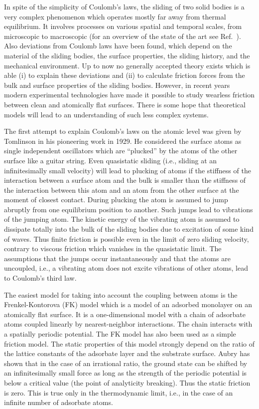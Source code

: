 In spite of the simplicity of Coulomb's laws, the sliding of two solid
bodies is a very complex phenomenon which operates mostly far away
from thermal equilibrium. It involves processes on various spatial
and temporal scales, from microscopic to macroscopic (for an overview
of the state of the art see Ref.~). Also
deviations from Coulomb laws have been found, which depend on the
material of the sliding bodies, the surface properties, the sliding
history, and the mechanical environment. Up to now no generally
accepted theory exists which is able (i) to explain these deviations
and (ii) to calculate friction forces from the bulk and surface
properties of the sliding bodies. However, in recent years modern
experimental technologies have made it possible to study wearless
friction between clean and atomically flat surfaces\cite{sin.92}.
There is some hope that theoretical models will lead to an
understanding of such less complex systems.

The first attempt to explain Coulomb's laws on the atomic level was
given by Tomlinson\cite{tom.29} in his pioneering work in 1929. He
considered the surface atoms as single independent oscillators which
are ``plucked'' by the atoms of the other surface like a guitar
string.  Even quasistatic sliding (i.e., sliding at an
infinitesimally small velocity) will lead to plucking of atoms if the
stiffness of the interaction between a surface atom and the bulk is
smaller than the stiffness of the interaction between this atom and
an atom from the other surface at the moment of closest
contact\cite{mcc.89,mcc.92}. During plucking the atom is assumed to
jump abruptly from one equilibrium position to another. Such jumps
lead to vibrations of the jumping atom. The kinetic energy of the
vibrating atom is assumed to dissipate totally into the bulk of the
sliding bodies due to excitation of some kind of waves. Thus finite
friction is possible even in the limit of zero sliding velocity,
contrary to viscous friction which vanishes in the quasistatic limit.
The assumptions that the jumps occur instantaneously and that the
atoms are uncoupled, i.e., a vibrating atom does not excite
vibrations of other atoms, lead to Coulomb's third
law\cite{tom.29,mcc.92}.

The easiest model for taking into account the coupling between atoms
is the Frenkel-Kontorova (FK) model\cite{fre.38} which is a model of
an adsorbed monolayer on an atomically flat surface. It is a
one-dimensional model with a chain of adsorbate atoms coupled
linearly by nearest-neighbor interactions. The chain interacts with a
spatially periodic potential. The FK model has also been used as a
simple friction model\cite{sok.84,mcc.89,mcc.92}.  The static
properties of this model strongly depend on the ratio of the lattice
constants of the adsorbate layer and the substrate surface. Aubry has
shown\cite{aub.78} that in the case of an irrational ratio, the
ground state can be shifted by an infinitesimally small force as long
as the strength of the periodic potential is below a critical value
(the point of analyticity breaking). Thus the static friction is
zero. This is true only in the thermodynamic limit, i.e., in the case
of an infinite number of adsorbate atoms. 

